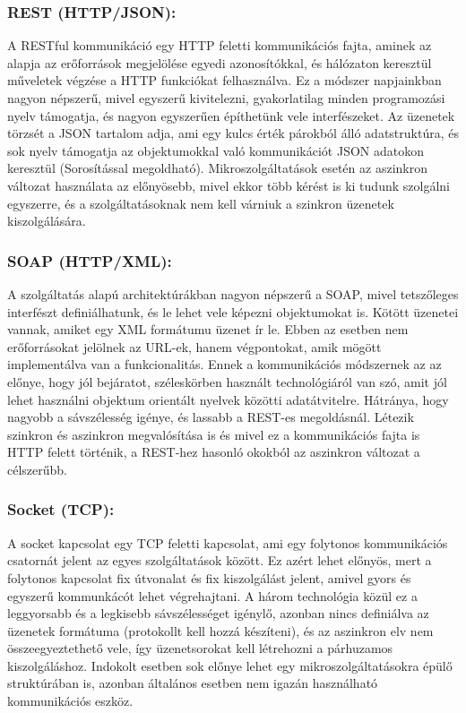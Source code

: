 \documentclass[11pt,magyar,a4paper,twoside,]{report}
\begin{document}
\subsubsection{REST (HTTP/JSON):}\label{rest-httpjson}

A RESTful\citep{microservices-light} kommunikáció egy HTTP feletti
kommunikációs fajta, aminek az alapja az erőforrások megjelölése egyedi
azonosítókkal, és hálózaton keresztül műveletek végzése a HTTP
funkciókat felhasználva. Ez a módszer napjainkban nagyon népszerű, mivel
egyszerű kivitelezni, gyakorlatilag minden programozási nyelv támogatja,
és nagyon egyszerűen építhetünk vele interfészeket. Az üzenetek törzsét
a JSON tartalom adja, ami egy kulcs érték párokból álló adatstruktúra,
és sok nyelv támogatja az objektumokkal való kommunikációt JSON adatokon
keresztül (Sorosítással megoldható). Mikroszolgáltatások esetén az
aszinkron változat használata az előnyösebb\citep{rest-async}, mivel
ekkor több kérést is ki tudunk szolgálni egyszerre, és a
szolgáltatásoknak nem kell várniuk a szinkron üzenetek kiszolgálására.

\subsubsection{SOAP (HTTP/XML):}\label{soap-httpxml}

A szolgáltatás alapú architektúrákban nagyon népszerű a
SOAP\citep{soap}, mivel tetszőleges interfészt definiálhatunk, és le
lehet vele képezni objektumokat is. Kötött üzenetei vannak, amiket egy
XML formátumu üzenet ír le. Ebben az esetben nem erőforrásokat jelölnek
az URL-ek, hanem végpontokat, amik mögött implementálva van a
funkcionalitás. Ennek a kommunikációs módszernek az az előnye, hogy jól
bejáratot, széleskörben használt technológiáról van szó, amit jól lehet
használni objektum orientált nyelvek közötti adatátvitelre. Hátránya,
hogy nagyobb a sávszélesség igénye, és lassabb a REST-es megoldásnál.
Létezik szinkron és aszinkron megvalósítása is és mivel ez a
kommunikációs fajta is HTTP felett történik, a REST-hez hasonló okokból
az aszinkron változat a célszerűbb.

\subsubsection{Socket (TCP):}\label{socket-tcp}

A socket\citep{socket} kapcsolat egy TCP feletti kapcsolat, ami egy
folytonos kommunikációs csatornát jelent az egyes szolgáltatások között.
Ez azért lehet előnyös, mert a folytonos kapcsolat fix útvonalat és fix
kiszolgálást jelent, amivel gyors és egyszerű kommunkácót lehet
végrehajtani. A három technológia közül ez a leggyorsabb és a legkisebb
sávszélességet igénylő, azonban nincs definiálva az üzenetek formátuma
(protokollt kell hozzá készíteni), és az aszinkron elv nem
összeegyeztethető vele, így üzenetsorokat kell létrehozni a párhuzamos
kiszolgáláshoz. Indokolt esetben sok előnye lehet egy
mikroszolgáltatásokra épülő struktúrában is, azonban általános esetben
nem igazán használható kommunikációs eszköz.
\end{document}
